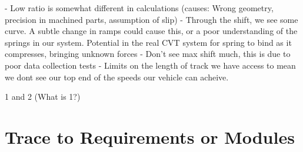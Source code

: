 \documentclass[12pt, titlepage]{article}
\begin{document}
- Low ratio is somewhat different in calculations (causes: Wrong geometry, precision in machined parts, assumption of slip)
- Through the shift, we see some curve. A subtle change in ramps could cause this, or a poor understanding of the springs in our system. Potential in the real CVT system for spring to bind as it compresses, bringing unknown forces
- Don't see max shift much, this is due to poor data collection tests - Limits on the length of track we have access to mean we dont see our top end of the speeds our vehicle can acheive.


1 and 2 (What is 1?)

\section{Trace to Requirements or Modules}
\end{document}
